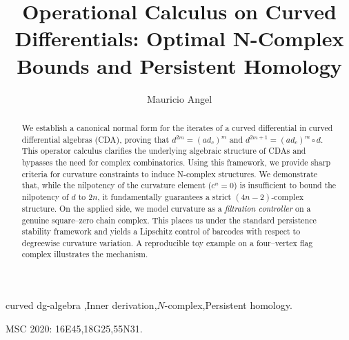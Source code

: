 \documentclass[preprint,12pt]{elsarticle}
\begin{document}
\begin{frontmatter}


\title{Operational Calculus on Curved Differentials: Optimal N-Complex Bounds and Persistent Homology}




\author{Mauricio Angel}

\begin{abstract}
We establish a canonical normal form for the iterates of a curved differential in curved differential algebras (CDA), proving that $d^{2m} = (ad_c)^m$ and $d^{2m+1} = (ad_c)^m \circ d$. This operator calculus clarifies the underlying algebraic structure of CDAs and bypasses the need for complex combinatorics. Using this framework, we provide sharp criteria for curvature constraints to induce N-complex structures. We demonstrate that, while the nilpotency of the curvature element ($c^n=0$) is insufficient to bound the nilpotency of $d$ to $2n$, it fundamentally guarantees a strict $(4n-2)$-complex structure. On the applied side, we model curvature as a \emph{filtration controller} on a genuine square–zero chain complex. This places us under the standard persistence stability framework
and yields a Lipschitz control of barcodes with respect to degreewise curvature variation. A reproducible toy example on a four–vertex flag complex illustrates the mechanism.
\end{abstract}

\begin{keyword}
curved dg-algebra \sep Inner derivation\sep $N$-complex\sep Persistent homology.

MSC 2020: 16E45\sep 18G25\sep 55N31.
\end{keyword}

\end{frontmatter}
\end{document}
